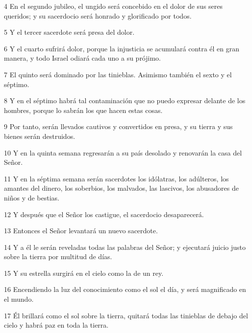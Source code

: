 \par 4 En el segundo jubileo, el ungido será concebido en el dolor de sus seres queridos; y su sacerdocio será honrado y glorificado por todos.

\par 5 Y el tercer sacerdote será presa del dolor.

\par 6 Y el cuarto sufrirá dolor, porque la injusticia se acumulará contra él en gran manera, y todo Israel odiará cada uno a su prójimo.

\par 7 El quinto será dominado por las tinieblas. Asimismo también el sexto y el séptimo.

\par 8 Y en el séptimo habrá tal contaminación que no puedo expresar delante de los hombres, porque lo sabrán los que hacen estas cosas.

\par 9 Por tanto, serán llevados cautivos y convertidos en presa, y su tierra y sus bienes serán destruidos.

\par 10 Y en la quinta semana regresarán a su país desolado y renovarán la casa del Señor.

\par 11 Y en la séptima semana serán sacerdotes los idólatras, los adúlteros, los amantes del dinero, los soberbios, los malvados, las lascivos, los abusadores de niños y de bestias.

\par 12 Y después que el Señor los castigue, el sacerdocio desaparecerá.

\par 13 Entonces el Señor levantará un nuevo sacerdote.

\par 14 Y a él le serán reveladas todas las palabras del Señor; y ejecutará juicio justo sobre la tierra por multitud de días.

\par 15 Y su estrella surgirá en el cielo como la de un rey.

\par 16 Encendiendo la luz del conocimiento como el sol el día, y será magnificado en el mundo.

\par 17 Él brillará como el sol sobre la tierra, quitará todas las tinieblas de debajo del cielo y habrá paz en toda la tierra.

